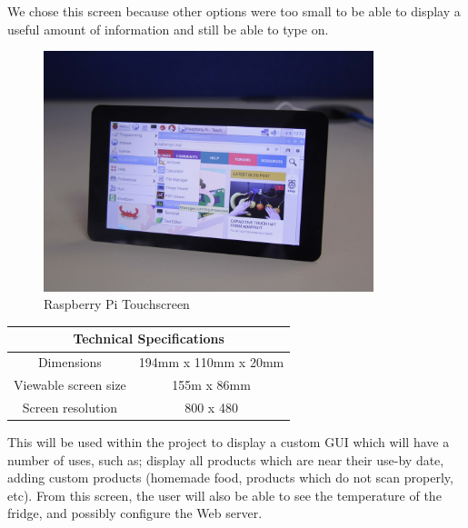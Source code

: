\documentclass[10pt]{article}
\begin{document}
We chose this screen because other options were too small to be able to display a useful amount of information and still be able to type on.

\begin{figure}[h]
\centering
\caption{Raspberry Pi Touchscreen}
\label{Raspberry Pi Touchscreen}
\includegraphics[height=7cm]{images/pi-touchscreen.jpg}
\end{figure}

\begin{center}
	\begin{tabular}{ | c | c | }
		\hline
	 	\multicolumn{2}{|c|}{Technical Specifications} \\ \hline
		Dimensions 		& 194mm x 110mm x 20mm \\ \hline
		Viewable screen size 	& 155m x 86mm \\ \hline
		Screen resolution	& 800 x 480 \\ \hline
	\end{tabular}
\end{center}

This will be used within the project to display a custom GUI which will have a number of uses, such as; display all products which are near their use-by date, adding custom products (homemade food, products which do not scan properly, etc). From this screen, the user will also be able to see the temperature of the fridge, and possibly configure the Web server.
\end{document}
